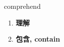 
\begin{frame}
{\huge comprehend}
\begin{center}
\begin{enumerate}\Large
  \item \textbf{理解}
  \item \textbf{包含, contain}
\end{enumerate}
\end{center}
\end{frame}
